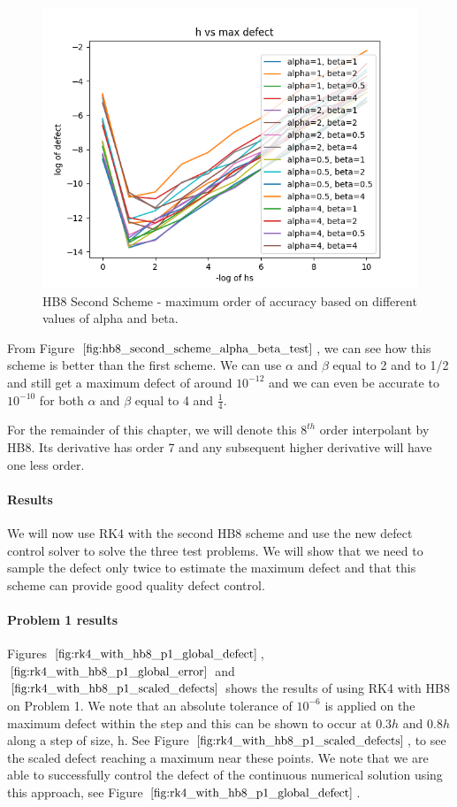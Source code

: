 \begin{figure}[H]
\centering
\includegraphics[width=0.7\linewidth]{./figures/hb8_second_scheme_alpha_beta_test}
\caption{HB8 Second Scheme - maximum order of accuracy based on different values of alpha and beta.}
\label{fig:hb8_second_scheme_alpha_beta_test}
\end{figure}

From Figure $\ref{fig:hb8_second_scheme_alpha_beta_test}$, we can see how this scheme is better than the first scheme. We can use $\alpha$ and $\beta$ equal to 2 and to 1/2 and still get a maximum defect of around $10^{-12}$ and we can even be accurate to $10^{-10}$ for both $\alpha$ and $\beta$ equal to 4 and $\frac{1}{4}$. 

For the remainder of this chapter, we will denote this $8^{th}$ order interpolant by HB8. Its derivative has order 7 and any subsequent higher derivative will have one less order.

\paragraph{Results}
We will now use RK4 with the second HB8 scheme and use the new defect control solver to solve the three test problems. We will show that we need to sample the defect only twice to estimate the maximum defect and that this scheme can provide good quality defect control.

\paragraph{Problem 1 results}
Figures $\ref{fig:rk4_with_hb8_p1_global_defect}$, $\ref{fig:rk4_with_hb8_p1_global_error}$ and $\ref{fig:rk4_with_hb8_p1_scaled_defects}$ shows the results of using RK4 with HB8 on Problem 1. We note that an absolute tolerance of $10^{-6}$ is applied on the maximum defect within the step and this can be shown to occur at $0.3h$ and $0.8h$ along a step of size, h. See Figure $\ref{fig:rk4_with_hb8_p1_scaled_defects}$, to see the scaled defect reaching a maximum near these points. We note that we are able to successfully control the defect of the continuous numerical solution using this approach, see Figure $\ref{fig:rk4_with_hb8_p1_global_defect}$. 

